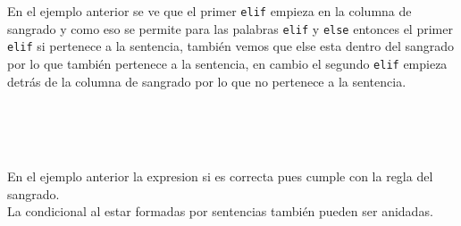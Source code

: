       En el ejemplo anterior se ve que el primer \texttt{elif} empieza en la columna de sangrado y como eso se permite para las palabras \texttt{elif} y \texttt{else} entonces el primer \texttt{elif} si pertenece a la sentencia, también vemos que else esta dentro del sangrado por lo que también pertenece a la sentencia, en cambio el segundo \texttt{elif} empieza detrás de la columna de sangrado por lo que no pertenece a la sentencia.
      
      \begin{fxcode}
         \\
         \\
         \\
         \end{fxcode}
         
         En el ejemplo anterior la expresion si es correcta pues cumple con la regla del sangrado.
         \\
         
         La condicional al estar formadas por sentencias también pueden ser anidadas.
         
         \begin{fxcode}
         \\
         \\
         \\
         \\
         \\
         \\
         \\
         \\
         \\
         \\
         \\
         \\
         \\
         \end{fxcode}
         
